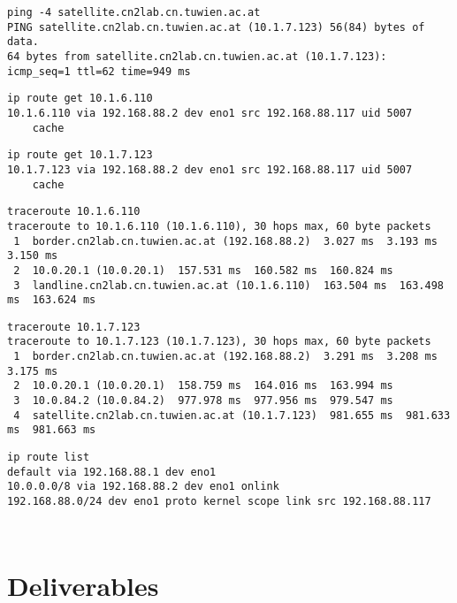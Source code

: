 \documentclass[parskip=full]{scrartcl}
\begin{document}
\begin{verbatim}
ping -4 satellite.cn2lab.cn.tuwien.ac.at
PING satellite.cn2lab.cn.tuwien.ac.at (10.1.7.123) 56(84) bytes of data.
64 bytes from satellite.cn2lab.cn.tuwien.ac.at (10.1.7.123): icmp_seq=1 ttl=62 time=949 ms
\end{verbatim}

\begin{verbatim}
ip route get 10.1.6.110
10.1.6.110 via 192.168.88.2 dev eno1 src 192.168.88.117 uid 5007
    cache
\end{verbatim}

\begin{verbatim}
ip route get 10.1.7.123
10.1.7.123 via 192.168.88.2 dev eno1 src 192.168.88.117 uid 5007
    cache
\end{verbatim}

\begin{verbatim}
traceroute 10.1.6.110
traceroute to 10.1.6.110 (10.1.6.110), 30 hops max, 60 byte packets
 1  border.cn2lab.cn.tuwien.ac.at (192.168.88.2)  3.027 ms  3.193 ms  3.150 ms
 2  10.0.20.1 (10.0.20.1)  157.531 ms  160.582 ms  160.824 ms
 3  landline.cn2lab.cn.tuwien.ac.at (10.1.6.110)  163.504 ms  163.498 ms  163.624 ms
\end{verbatim}

\begin{verbatim}
traceroute 10.1.7.123
traceroute to 10.1.7.123 (10.1.7.123), 30 hops max, 60 byte packets
 1  border.cn2lab.cn.tuwien.ac.at (192.168.88.2)  3.291 ms  3.208 ms  3.175 ms
 2  10.0.20.1 (10.0.20.1)  158.759 ms  164.016 ms  163.994 ms
 3  10.0.84.2 (10.0.84.2)  977.978 ms  977.956 ms  979.547 ms
 4  satellite.cn2lab.cn.tuwien.ac.at (10.1.7.123)  981.655 ms  981.633 ms  981.663 ms
\end{verbatim}

\begin{verbatim}
ip route list
default via 192.168.88.1 dev eno1 
10.0.0.0/8 via 192.168.88.2 dev eno1 onlink 
192.168.88.0/24 dev eno1 proto kernel scope link src 192.168.88.117 
\end{verbatim}
\begin{verbatim}

\end{verbatim}
\begin{verbatim}

\end{verbatim}


\section{Deliverables}
\end{document}

